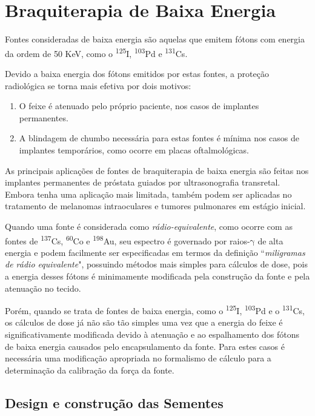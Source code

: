 \documentclass[11pt,a4paper]{article}
\begin{document}
	\section{Braquiterapia de Baixa Energia}
		

		Fontes consideradas de baixa energia são aquelas que emitem fótons com energia da ordem de 50 KeV, como o \textsuperscript{125}I, \textsuperscript{103}Pd e \textsuperscript{131}Cs.

		Devido a baixa energia dos fótons emitidos por estas fontes, a proteção radiológica se torna mais efetiva por dois motivos:

			\begin{enumerate}
				\item O feixe é atenuado pelo próprio paciente, nos casos de implantes permanentes.
				\item A blindagem de chumbo necessária para estas fontes é mínima nos casos de implantes temporários, como ocorre em placas oftalmológicas.
			\end{enumerate}
		
		As principais aplicações de fontes de braquiterapia de baixa energia são feitas nos implantes permanentes de próstata guiados por ultrasonografia transretal. Embora tenha uma aplicação mais limitada, também podem ser aplicadas no tratamento de melanomas intraoculares e tumores pulmonares em estágio inicial.

		Quando uma fonte é considerada como \textit{\textcolor{CarnationPink}{rádio-equivalente}}, como ocorre com as fontes de \textsuperscript{137}Cs, \textsuperscript{60}Co e \textsuperscript{198}Au, seu espectro é governado por raios-$\mathrm{\gamma}$ de alta energia e podem facilmente ser especificadas em termos da definição ``\textit{miligramas de rádio equivalente}", possuindo métodos mais simples para cálculos de dose, pois a energia desses fótons é minimamente modificada pela construção da fonte e pela atenuação no tecido. 

		Porém, quando se trata de fontes de baixa energia, como o \textsuperscript{125}I, \textsuperscript{103}Pd e o \textsuperscript{131}Cs, os cálculos de dose já não são tão simples uma vez que a energia do feixe é significativamente modificada devido à atenuação e ao espalhamento dos fótons de baixa energia causados pelo encapsulamento da fonte. Para estes casos é necessária uma modificação apropriada no formalismo de cálculo para a determinação da calibração da força da fonte.

		\subsection{Design e construção das Sementes}
\end{document}
